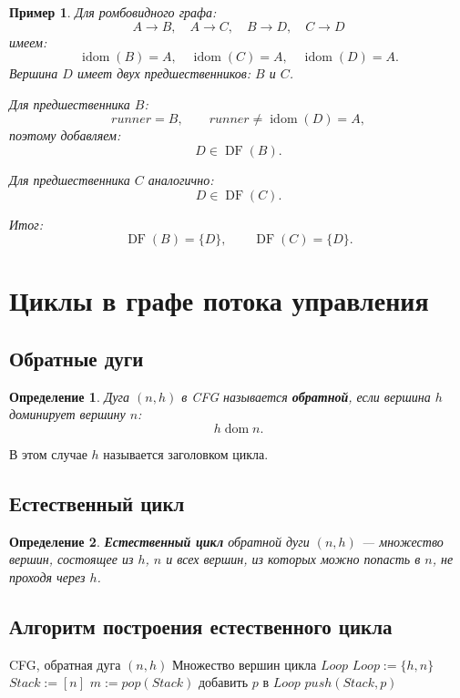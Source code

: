 \documentclass[12pt,a4paper]{article}
\newtheorem{definition}{Определение}
\newtheorem{example}{Пример}
\DeclareMathOperator{\dom}{dom}
\DeclareMathOperator{\pred}{pred}
\DeclareMathOperator{\idom}{idom}
\DeclareMathOperator{\DF}{DF}
\begin{document}
\begin{example}
Для ромбовидного графа:
\[
A\to B,\quad A\to C,\quad B\to D,\quad C\to D
\]
имеем:
\[
\idom(B)=A,\quad \idom(C)=A,\quad \idom(D)=A.
\]
Вершина $D$ имеет двух предшественников: $B$ и $C$.

Для предшественника $B$:
\[
runner=B,\qquad runner\neq \idom(D)=A,
\]
поэтому добавляем:
\[
D\in \DF(B).
\]

Для предшественника $C$ аналогично:
\[
D\in \DF(C).
\]

Итог:
\[
\DF(B)=\{D\},\qquad
\DF(C)=\{D\}.
\]
\end{example}

\section{Циклы в графе потока управления}

\subsection{Обратные дуги}

\begin{definition}
Дуга $(n,h)$ в CFG называется \textbf{обратной}, если вершина $h$ доминирует вершину $n$:
\[
h\dom n.
\]
\end{definition}

В этом случае $h$ называется заголовком цикла.

\subsection{Естественный цикл}

\begin{definition}
\textbf{Естественный цикл} обратной дуги $(n,h)$ --- множество вершин, состоящее из $h$, $n$ и всех вершин, из которых можно попасть в $n$, не проходя через $h$.
\end{definition}

\subsection{Алгоритм построения естественного цикла}

\begin{algorithm}[H]
\caption{Построение естественного цикла для обратной дуги $(n,h)$}
\begin{algorithmic}[1]
\Require CFG, обратная дуга $(n,h)$
\Ensure Множество вершин цикла $Loop$
\State $Loop := \{h,n\}$
\State $Stack := [n]$
    \State $m := pop(Stack)$
    \For{каждый $p\in \pred(m)$}
            \State добавить $p$ в $Loop$
            \State $push(Stack,p)$
        \EndIf
    \EndFor
\EndWhile
\end{algorithmic}
\end{algorithm}
\end{document}
